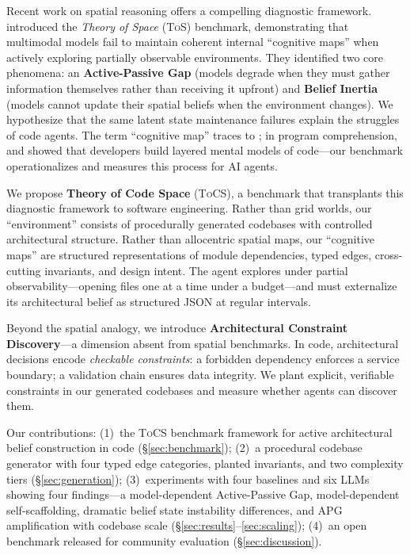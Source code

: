 \documentclass{article}
\newcommand{\tocs}{\textsc{ToCS}}
\newcommand{\tos}{\textsc{ToS}}
\begin{document}
Recent work on spatial reasoning offers a compelling diagnostic framework. \citet{zhang2026theoryofspace} introduced the \emph{Theory of Space} (\tos{}) benchmark, demonstrating that multimodal models fail to maintain coherent internal ``cognitive maps'' when actively exploring partially observable environments. They identified two core phenomena: an \textbf{Active-Passive Gap} (models degrade when they must gather information themselves rather than receiving it upfront) and \textbf{Belief Inertia} (models cannot update their spatial beliefs when the environment changes). We hypothesize that the same latent state maintenance failures explain the struggles of code agents. The term ``cognitive map'' traces to \citet{tolman1948cognitive}; in program comprehension, \citet{pennington1987stimulus} and \citet{vonmayrhauser1995program} showed that developers build layered mental models of code---our benchmark operationalizes and measures this process for AI agents.

We propose \textbf{Theory of Code Space} (\tocs{}), a benchmark that transplants this diagnostic framework to software engineering. Rather than grid worlds, our ``environment'' consists of procedurally generated codebases with controlled architectural structure. Rather than allocentric spatial maps, our ``cognitive maps'' are structured representations of module dependencies, typed edges, cross-cutting invariants, and design intent. The agent explores under partial observability---opening files one at a time under a budget---and must externalize its architectural belief as structured JSON at regular intervals.

Beyond the spatial analogy, we introduce \textbf{Architectural Constraint Discovery}---a dimension absent from spatial benchmarks. In code, architectural decisions encode \emph{checkable constraints}: a forbidden dependency enforces a service boundary; a validation chain ensures data integrity. We plant explicit, verifiable constraints in our generated codebases and measure whether agents can discover them.

Our contributions: (1)~the \tocs{} benchmark framework for active architectural belief construction in code (\S\ref{sec:benchmark}); (2)~a procedural codebase generator with four typed edge categories, planted invariants, and two complexity tiers (\S\ref{sec:generation}); (3)~experiments with four baselines and six LLMs showing four findings---a model-dependent Active-Passive Gap, model-dependent self-scaffolding, dramatic belief state instability differences, and APG amplification with codebase scale (\S\ref{sec:results}--\ref{sec:scaling}); (4)~an open benchmark released for community evaluation (\S\ref{sec:discussion}).
\end{document}
